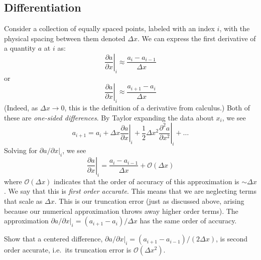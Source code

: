 \subsection{Differentiation}
\label{ch:intro:diff}
Consider a collection of equally spaced points, labeled with an index
$i$, with the physical spacing between them denoted $\Delta x$.  We
can express the first derivative of a quantity $a$ at 
$i$ as:
\begin{equation}
\left . \frac{\partial a}{\partial x} \right |_i \approx \frac{a_i - a_{i-1}}{\Delta x}
\end{equation}
or
\begin{equation}
\left . \frac{\partial a}{\partial x} \right |_i \approx \frac{a_{i+1} - a_i}{\Delta x}
\end{equation}
%
(Indeed, as $\Delta x \rightarrow 0$, this is the definition of a derivative from calculus.)
Both of these are {\em one-sided differences}.  By Taylor expanding the data
about $x_i$, we see
\begin{equation}
a_{i+1} = a_i + \Delta x \left . \frac{\partial a}{\partial x} \right |_i + \frac{1}{2} \Delta x^2 \left . \frac{\partial^2 a}{\partial x^2} \right |_i + \ldots
\end{equation}
Solving for ${\partial a}/{\partial x} |_i$, we see
\begin{equation}
\left . \frac{\partial a}{\partial x} \right |_i = \frac{a_i - a_{i-1}}{\Delta x} + \mathcal{O}(\Delta x)
\end{equation}
where $\mathcal{O}(\Delta x)$ indicates that the order of accuracy of
this approximation is $\sim \Delta x$.  We say that this is {\em first
  order accurate}.  This means that we are neglecting terms that scale
as $\Delta x$.  This is our truncation error (just as discussed above,
arising because our numerical approximation throws away higher order
terms).  The approximation ${\partial a}/{\partial x} |_i = ({a_{i+1}
  - a_i})/{\Delta x}$ has the same order of accuracy.

\begin{exercise}
{Show that a centered difference, ${\partial a}/
  {\partial x} |_i = ({a_{i+1} - a_{i-1}})/({2 \Delta x})$, is second order
accurate, i.e.\ its truncation error is $\mathcal{O}(\Delta x^2)$.}
\end{exercise}

